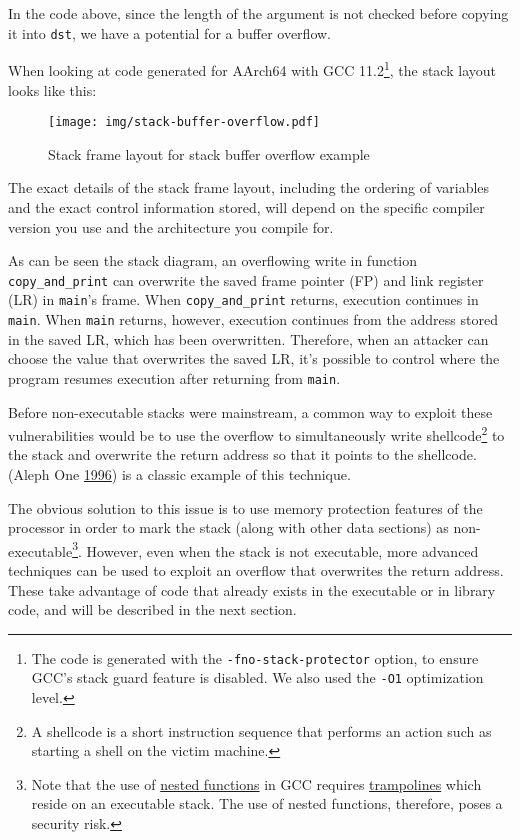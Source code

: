 \documentclass[a4paper,]{report}
\makeatletter
\newcounter{figno}
\newenvironment{fignos:no-prefix-figure-caption}{
  \caption@ifcompatibility{}{
    \let\oldthefigure\thefigure
    \let\oldtheHfigure\theHfigure
    \renewcommand{\thefigure}{figno:\thefigno}
    \renewcommand{\theHfigure}{figno:\thefigno}
    \stepcounter{figno}
    \captionsetup{labelformat=empty}
  }
}{
  \caption@ifcompatibility{}{
    \captionsetup{labelformat=default}
    \let\thefigure\oldthefigure
    \let\theHfigure\oldtheHfigure
    \addtocounter{figure}{-1}
  }
}
\makeatother
\begin{document}
In the code above, since the length of the argument is not checked
before copying it into \texttt{dst}, we have a potential for a buffer
overflow.

When looking at code generated for AArch64 with GCC 11.2\footnote{The
  code is generated with the \texttt{-fno-stack-protector} option, to
  ensure GCC's stack guard feature is disabled. We also used the
  \texttt{-O1} optimization level.}, the stack layout looks like this:

\begin{fignos:no-prefix-figure-caption}

\begin{figure}
\centering
\texttt{[image: img/stack-buffer-overflow.pdf]}
\caption{Stack frame layout for stack buffer overflow example}
\end{figure}

\end{fignos:no-prefix-figure-caption}

The exact details of the stack frame layout, including the ordering of
variables and the exact control information stored, will depend on the
specific compiler version you use and the architecture you compile for.

As can be seen the stack diagram, an overflowing write in function
\texttt{copy\_and\_print} can overwrite the saved frame pointer (FP) and
link register (LR) in \texttt{main}'s frame. When
\texttt{copy\_and\_print} returns, execution continues in \texttt{main}.
When \texttt{main} returns, however, execution continues from the
address stored in the saved LR, which has been overwritten. Therefore,
when an attacker can choose the value that overwrites the saved LR, it's
possible to control where the program resumes execution after returning
from \texttt{main}.

Before non-executable stacks were mainstream, a common way to exploit
these vulnerabilities would be to use the overflow to simultaneously
write shellcode\footnote{A shellcode is a short instruction sequence
  that performs an action such as starting a shell on the victim
  machine.} to the stack and overwrite the return
address so that it points to the shellcode. (Aleph One
\protect\hyperlink{ref-AlephOne1996}{1996}) is a classic example of this
technique.

The obvious solution to this issue is to use memory protection features
of the processor in order to mark the stack (along with other data
sections) as non-executable\footnote{Note that the use of
  \href{https://gcc.gnu.org/onlinedocs/gcc/Nested-Functions.html}{nested
  functions} in GCC requires
  \href{https://gcc.gnu.org/onlinedocs/gccint/Trampolines.html}{trampolines}
  which reside on an executable stack. The use of nested functions,
  therefore, poses a security risk.}. However, even when the stack is
not executable, more advanced techniques can be used to exploit an
overflow that overwrites the return address. These take advantage of
code that already exists in the executable or in library code, and will
be described in the next section.
\end{document}
